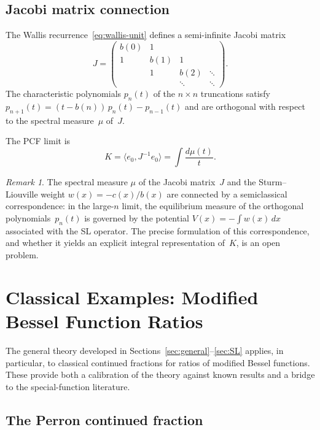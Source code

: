 \documentclass[11pt,a4paper]{amsart}
\theoremstyle{plain}
\theoremstyle{definition}
\theoremstyle{remark}
\newtheorem{remark}[theorem]{Remark}
\begin{document}
\subsection{Jacobi matrix connection}
The Wallis recurrence~\eqref{eq:wallis-unit} defines a semi-infinite
Jacobi matrix
\[
  J = \begin{pmatrix}
    b(0) & 1 & & \\
    1 & b(1) & 1 & \\
    & 1 & b(2) & \ddots \\
    & & \ddots & \ddots
  \end{pmatrix}.
\]
The characteristic polynomials $p_n(t)$ of the $n\times n$
truncations satisfy $p_{n+1}(t) = (t-b(n))\,p_n(t) - p_{n-1}(t)$
and are orthogonal with respect to the spectral measure~$\mu$ of~$J$.

The PCF limit is
\begin{equation}\label{eq:pcf-resolvent}
  K = \langle e_0, J^{-1} e_0\rangle = \int \frac{d\mu(t)}{t}.
\end{equation}

\begin{remark}
The spectral measure $\mu$ of the Jacobi matrix~$J$ and the
Sturm--Liouville weight $w(x) = -c(x)/b(x)$ are connected by a
semiclassical correspondence: in the large-$n$ limit, the equilibrium
measure of the orthogonal polynomials~$p_n(t)$ is governed by the
potential $V(x) = -\int w(x)\,dx$ associated with the SL operator.
The precise formulation of this correspondence, and whether it yields
an explicit integral representation of~$K$, is an open problem.
\end{remark}

\section{Classical Examples: Modified Bessel Function Ratios}
\label{sec:bessel}

The general theory developed in Sections~\ref{sec:general}--\ref{sec:SL}
applies, in particular, to classical continued fractions for ratios
of modified Bessel functions.  These provide both a calibration of
the theory against known results and a bridge to the special-function
literature.

\subsection{The Perron continued fraction}
\end{document}
